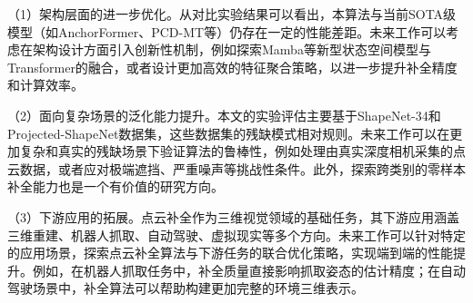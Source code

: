 （1）架构层面的进一步优化。从对比实验结果可以看出，本算法与当前SOTA级模型（如AnchorFormer、PCD-MT等）仍存在一定的性能差距。未来工作可以考虑在架构设计方面引入创新性机制，例如探索Mamba等新型状态空间模型与Transformer的融合，或者设计更加高效的特征聚合策略，以进一步提升补全精度和计算效率。

（2）面向复杂场景的泛化能力提升。本文的实验评估主要基于ShapeNet-34和Projected-ShapeNet数据集，这些数据集的残缺模式相对规则。未来工作可以在更加复杂和真实的残缺场景下验证算法的鲁棒性，例如处理由真实深度相机采集的点云数据，或者应对极端遮挡、严重噪声等挑战性条件。此外，探索跨类别的零样本补全能力也是一个有价值的研究方向。

（3）下游应用的拓展。点云补全作为三维视觉领域的基础任务，其下游应用涵盖三维重建、机器人抓取、自动驾驶、虚拟现实等多个方向。未来工作可以针对特定的应用场景，探索点云补全算法与下游任务的联合优化策略，实现端到端的性能提升。例如，在机器人抓取任务中，补全质量直接影响抓取姿态的估计精度；在自动驾驶场景中，补全算法可以帮助构建更加完整的环境三维表示。